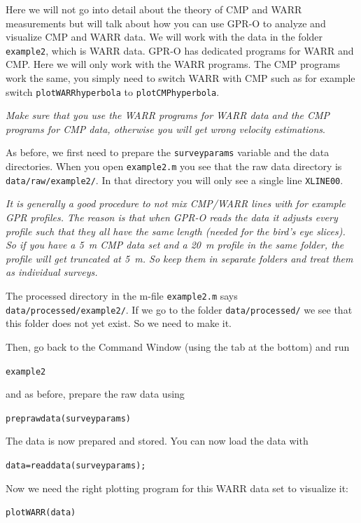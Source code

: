 \documentclass[11pt]{article}
\begin{document}
Here we will not go into detail about the theory of CMP and WARR
measurements but will talk about how you can use GPR-O to analyze and
visualize CMP and WARR data. We will work with the data in the folder
\verb#example2#, which is WARR data. GPR-O has dedicated programs for
WARR and CMP. Here we will only work with the WARR programs. The CMP
programs work the same, you simply need to switch WARR with CMP such
as for example switch \verb#plotWARRhyperbola# to
\verb#plotCMPhyperbola#.

\emph{Make sure that you use the WARR programs for WARR data and the
  CMP programs for CMP data, otherwise you will get wrong velocity
  estimations}.

As before, we first need to prepare the \verb#surveyparams# variable
and the data directories. When you open \verb#example2.m# you see that
the raw data directory is \verb#data/raw/example2/#. In that directory
you will only see a single line \verb#XLINE00#.

\emph{It is generally a good procedure to not mix CMP/WARR lines with
  for example GPR profiles. The reason is that when GPR-O reads the
  data it adjusts every profile such that they all have the same
  length (needed for the bird's eye slices). So if you have a \SI{5}{m} CMP
  data set and a \SI{20}{m} profile in the same folder, the profile will get
  truncated at \SI{5}{m}. So keep them in separate folders and treat them as
  individual surveys.}

The processed directory in the m-file \verb#example2.m# says
\verb#data/processed/example2/#. If we go to the folder
\verb#data/processed/# we see that this folder does not yet exist. So we
need to make it.

Then, go back to the Command Window (using the tab at the bottom) and
run

\qquad \verb#example2#

and as before, prepare the raw data using

\qquad \verb#preprawdata(surveyparams)#

The data is now prepared and stored. You can now load the data with

\qquad \verb#data=readdata(surveyparams);#

Now we need the right plotting program for this WARR data set to
visualize it:

\qquad \verb#plotWARR(data)#
 
\end{document}

